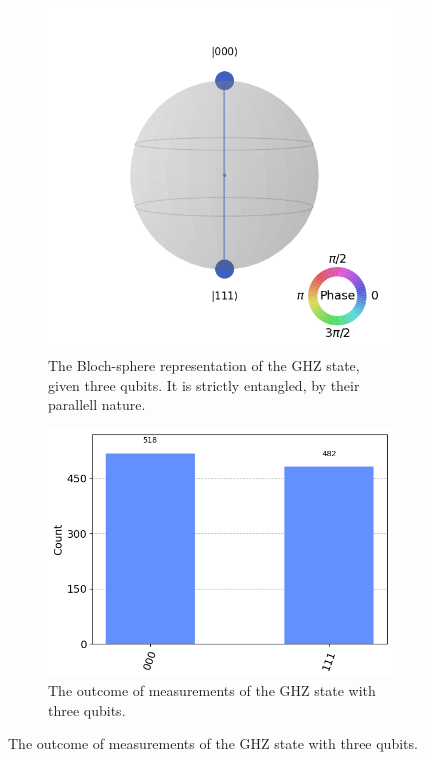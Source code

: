 \begin{figure}
    \centering
    \begin{subfigure}{0.48\textwidth}
        \includegraphics[width=\textwidth]{figs/GHZ qsphere.png}
        \caption{The Bloch-sphere representation of the GHZ state, given three qubits. It is strictly entangled, by their parallell nature.}
        \label{fig:qshpere}
    \end{subfigure}
    \hfill
    \begin{subfigure}{0.48\textwidth}
        \includegraphics[width=\textwidth]{figs/GHZ Counts.png}
        \caption{The outcome of measurements of the GHZ state with three qubits.}
        \label{fig:GHZ_measure}
    \end{subfigure}
\end{figure}
